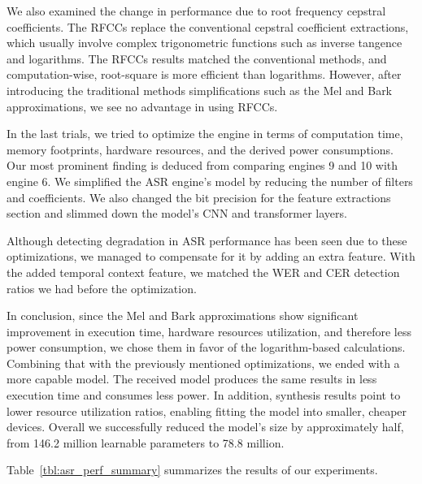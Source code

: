 We also examined the change in performance 
due to root frequency cepstral coefficients.
The RFCCs replace the conventional cepstral coefficient extractions, 
which usually involve complex trigonometric functions 
such as inverse tangence and logarithms.
The RFCCs results matched the conventional methods, and  
computation-wise, root-square is more efficient than logarithms.
However, after introducing the traditional methods simplifications 
such as the Mel and Bark approximations, 
we see no advantage in using RFCCs.

In the last trials, we tried to optimize 
the engine in terms of computation time, 
memory footprints, hardware resources, and the derived power consumptions.
Our most prominent finding is deduced 
from comparing engines 9 and 10 with engine 6. 
We simplified the ASR engine's model by reducing 
the number of filters and coefficients. 
We also changed the bit precision for the feature extractions section 
and slimmed down the model's CNN and transformer layers.

Although detecting degradation in ASR performance 
has been seen due to these optimizations, 
we managed to compensate for it by adding an extra feature. 
With the added temporal context feature, we matched the 
WER and CER detection ratios we had before the optimization. 

In conclusion, since the Mel and Bark approximations show significant 
improvement in execution time, 
hardware resources utilization, and therefore less power consumption, 
we chose them in favor of the logarithm-based calculations. 
Combining that with the previously mentioned optimizations, 
we ended with a more capable model.
The received model produces the same results in less execution time and consumes less power. 
In addition, synthesis results point to lower resource utilization ratios, 
enabling fitting the model into smaller, cheaper devices. 
Overall we successfully reduced the model's size by approximately half, 
from 146.2 million learnable parameters to 78.8 million.

Table~\ref{tbl:asr_perf_summary} summarizes the results of our experiments.

